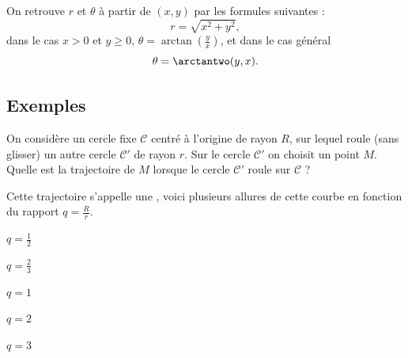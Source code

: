 \documentclass[11pt,class=report,crop=false]{standalone}
\begin{document}
On retrouve  $r$ et $\theta$ à partir de $(x,y)$ par les formules suivantes :
$$r = \sqrt{x^2+y^2},$$
dans le cas $x>0$ et $y\ge0$, $\theta = \arctan\left(\frac yx\right)$,
et dans le cas général 
$$\theta = \arctantwo(y, x).$$


\subsection{Exemples}


\begin{exemple}
On considère un cercle fixe $\mathcal{C}$ centré à l'origine de rayon $R$, sur lequel roule (sans glisser) un autre cercle $\mathcal{C}'$ de rayon $r$. Sur le cercle $\mathcal{C}'$ on choisit un point $M$. Quelle est la trajectoire de $M$ lorsque le cercle $\mathcal{C}'$ roule sur $\mathcal{C}$ ?



Cette trajectoire s'appelle une , voici plusieurs allures de cette courbe en fonction du rapport $q=\frac{R}{r}$.

\begin{center}
	\begin{minipage}{0.32\textwidth}\center
		
		$q=\frac12$
	\end{minipage}
	\begin{minipage}{0.32\textwidth}\center
		
		$q=\frac23$
    \end{minipage}
	\begin{minipage}{0.32\textwidth}\center
		
		$q=1$
	\end{minipage}
	
	\begin{minipage}{0.32\textwidth}\center
		
		$q=2$
	\end{minipage}	
	\begin{minipage}{0.32\textwidth}\center
	
	    $q=3$
	\end{minipage}	
	\begin{minipage}{0.32\textwidth}\center
		

\end{minipage}
\end{center}
\end{exemple}
\end{document}
